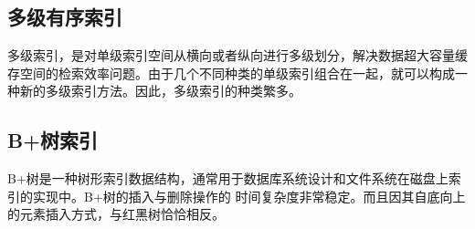 \subsection{多级有序索引}

多级索引，是对单级索引空间从横向或者纵向进行多级划分，解决数据超大容量缓存空间的检索效率问题。由于几个不同种类的单级索引组合在一起，就可以构成一种新的多级索引方法。因此，多级索引的种类繁多。

\subsection{B+树索引}
B+树\cite{bplustree2012}是一种树形索引数据结构，通常用于数据库系统设计和文件系统在磁盘上索引的实现中。B+树的插入与删除操作的 时间复杂度非常稳定。而且因其自底向上的元素插入方式，与红黑树恰恰相反。


